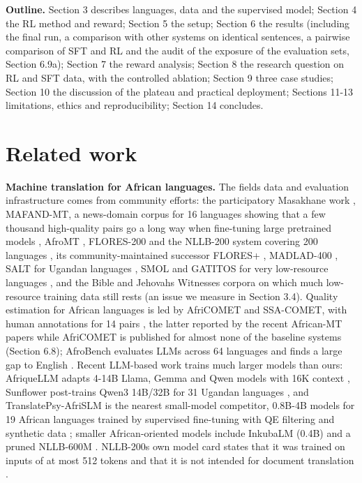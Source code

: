 \textbf{Outline.} Section 3 describes languages, data and the supervised model; Section 4 the RL method and reward; Section 5 the setup; Section 6 the results (including the final run, a comparison with other systems on identical sentences, a pairwise comparison of SFT and RL and the audit of the exposure of the evaluation sets, Section 6.9a); Section 7 the reward analysis; Section 8 the research question on RL and SFT data, with the controlled ablation; Section 9 three case studies; Section 10 the discussion of the plateau and practical deployment; Sections 11-13 limitations, ethics and reproducibility; Section 14 concludes.

\section{Related work}\label{related-work}

\textbf{Machine translation for African languages.} The field\textquotesingle s data and evaluation infrastructure comes from community efforts: the participatory Masakhane work \citep{nekoto2020participatory}, MAFAND-MT, a news-domain corpus for 16 languages showing that a few thousand high-quality pairs go a long way when fine-tuning large pretrained models \citep{adelani2022mafand}, AfroMT \citep{reid2021afromt}, FLORES-200 and the NLLB-200 system covering 200 languages \citep{goyal2022flores101, nllb2022nllb, nllb2024nature}, its community-maintained successor FLORES+ \citep{oldi2025floresplus, dale2025oldi}, MADLAD-400 \citep{kudugunta2023madlad}, SALT for Ugandan languages \citep{akera2022salt}, SMOL and GATITOS for very low-resource languages \citep{caswell2025smol}, and the Bible and Jehovah\textquotesingle s Witnesses corpora \citep{agic2019jw300, akerman2023ebible} on which much low-resource training data still rests (an issue we measure in Section 3.4). Quality estimation for African languages is led by AfriCOMET \citep{wang2024africomet} and SSA-COMET, with human annotations for 14 pairs \citep{li2025ssacomet}, the latter reported by the recent African-MT papers while AfriCOMET is published for almost none of the baseline systems (Section 6.8); AfroBench evaluates LLMs across 64 languages and finds a large gap to English \citep{ojo2025afrobench}. Recent LLM-based work trains much larger models than ours: AfriqueLLM adapts 4-14B Llama, Gemma and Qwen models with 16K context \citep{yu2026afriquellm}, Sunflower post-trains Qwen3 14B/32B for 31 Ugandan languages \citep{akera2025sunflower}, and TranslatePsy-AfriSLM is the nearest small-model competitor, 0.8B-4B models for 19 African languages trained by supervised fine-tuning with QE filtering and synthetic data \citep{gritta2026translatepsy}; smaller African-oriented models include InkubaLM (0.4B) \citep{tonja2024inkubalm} and a pruned NLLB-600M \citep{moslem2026afrinllb}. NLLB-200\textquotesingle s own model card states that it was trained on inputs of at most 512 tokens and that it is not intended for document translation \citep{nllb200_card}.

